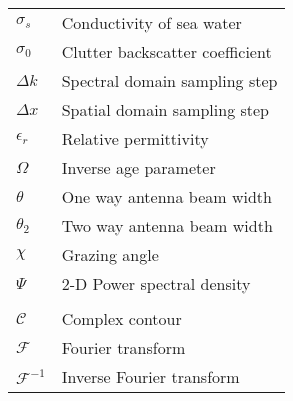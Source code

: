 \begin{supertabular}{ll}
$\sigma_s$ & Conductivity of sea water \\
$\sigma_0$ & Clutter backscatter coefficient \\
$\Delta k$ & Spectral domain sampling step \\
$\Delta x$ & Spatial domain sampling step \\
$\epsilon_r$ & Relative permittivity \\
$\Omega$ & Inverse age parameter \\
$\theta$ & One way antenna beam width \\
$\theta_2$ & Two way antenna beam width \\
$\chi$ & Grazing angle \\
$\Psi $ & 2-D Power spectral density \\
\\
$\mathcal{C}$ & Complex contour \\
$\mathcal{F}$ & Fourier transform \\
$\mathcal{F}^{-1}$ & Inverse Fourier transform \\
\end{supertabular}